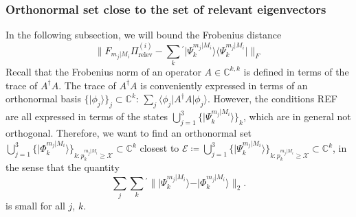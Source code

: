 \subsubsection{Orthonormal set close to the set of relevant eigenvectors}
In the following subsection, we will bound the Frobenius distance
\begin{equation}
\|F_{m_j\vert M_i}\Pi_{\text{relev}}^{(i)}-\sum_{k}{}^{'}\vert \Psi_k^{m_j\vert M_i}\rangle \langle \Psi_k^{m_j\vert M_i}\vert \|_F
\end{equation}
Recall that the Frobenius norm of an operator $A\in\mathbb{C}^{k,k}$ is defined in terms of the trace of $A^{\dag}A$. The trace of $A^{\dag}A$ is conveniently expressed in terms of an orthonormal basis $\{\vert \phi_j \rangle\}_j\subset \mathbb{C}^k$: $\sum_j \langle \phi_j \vert A^{\dag}A \vert \phi_j \rangle$. However, the conditions REF are all expressed in terms of the states $\bigcup\limits_{j=1}^3\{\vert \Psi_k^{m_j\vert M_i} \rangle\}_k$, which are in general not orthogonal. Therefore, we want to find an orthonormal set $\bigcup\limits_{j=1}^3\{\vert \Phi_k^{m_j\vert M_i}\rangle\}_{k:p_k^{m_j\vert M_i}\geq \mathcal{X}}\subset\mathbb{C}^k$ closest to $\mathcal{E}\coloneqq\bigcup\limits_{j=1}^3\{\vert \Psi_k^{m_j\vert M_i}\rangle\}_{k:p_k^{m_j\vert M_i}\geq \mathcal{X}}\subset\mathbb{C}^k$, in the sense that the quantity
\begin{equation}
\sum_{j}\sum_{k}{}^{'}\|\vert \Psi_k^{m_j\vert M_i} \rangle - \vert \Phi_k^{m_j\vert M_i} \rangle \|_2.
\end{equation}
is small for all $j$, $k$.

